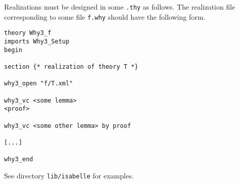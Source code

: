 Realizations must be designed in some \texttt{.thy} as follows.
The realization file corresponding to some \why file \texttt{f.why}
should have the following form.
\begin{verbatim}
theory Why3_f
imports Why3_Setup
begin

section {* realization of theory T *}

why3_open "f/T.xml"

why3_vc <some lemma>
<proof>

why3_vc <some other lemma> by proof

[...]

why3_end
\end{verbatim}

See directory \texttt{lib/isabelle} for examples.


